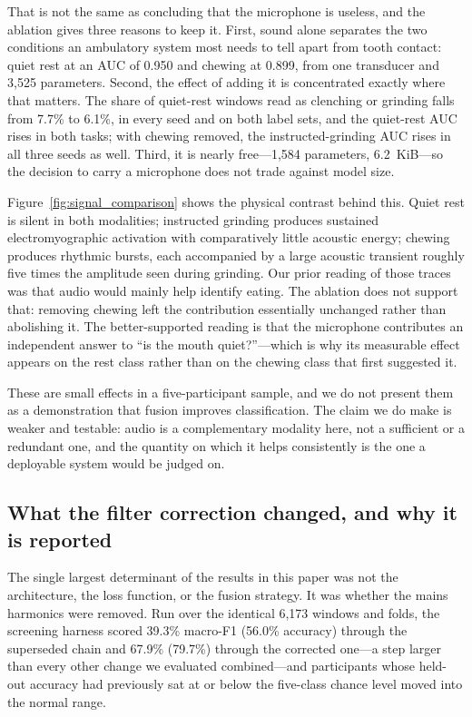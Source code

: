 \documentclass[pdflatex,sn-nature,iicol]{sn-jnl}
\begin{document}
That is not the same as concluding that the microphone is useless, and the ablation gives three reasons to keep it. First, sound alone separates the two conditions an ambulatory system most needs to tell apart from tooth contact: quiet rest at an AUC of 0.950 and chewing at 0.899, from one transducer and 3,525 parameters. Second, the effect of adding it is concentrated exactly where that matters. The share of quiet-rest windows read as clenching or grinding falls from 7.7\% to 6.1\%, in every seed and on both label sets, and the quiet-rest AUC rises in both tasks; with chewing removed, the instructed-grinding AUC rises in all three seeds as well. Third, it is nearly free---1,584 parameters, 6.2~KiB---so the decision to carry a microphone does not trade against model size.

Figure~\ref{fig:signal_comparison} shows the physical contrast behind this. Quiet rest is silent in both modalities; instructed grinding produces sustained electromyographic activation with comparatively little acoustic energy; chewing produces rhythmic bursts, each accompanied by a large acoustic transient roughly five times the amplitude seen during grinding. Our prior reading of those traces was that audio would mainly help identify eating. The ablation does not support that: removing chewing left the contribution essentially unchanged rather than abolishing it. The better-supported reading is that the microphone contributes an independent answer to ``is the mouth quiet?''---which is why its measurable effect appears on the rest class rather than on the chewing class that first suggested it.

These are small effects in a five-participant sample, and we do not present them as a demonstration that fusion improves classification. The claim we do make is weaker and testable: audio is a complementary modality here, not a sufficient or a redundant one, and the quantity on which it helps consistently is the one a deployable system would be judged on.

\subsection{What the filter correction changed, and why it is reported}

The single largest determinant of the results in this paper was not the architecture, the loss function, or the fusion strategy. It was whether the mains harmonics were removed. Run over the identical 6,173 windows and folds, the screening harness scored 39.3\% macro-F1 (56.0\% accuracy) through the superseded chain and 67.9\% (79.7\%) through the corrected one---a step larger than every other change we evaluated combined---and participants whose held-out accuracy had previously sat at or below the five-class chance level moved into the normal range.
\end{document}
